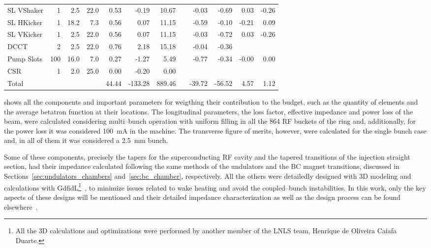 \begin{sidewaystable}
{\begin{tabular}{l d{0} d{-1} d{-1} d{-1} d{-1} d{-1} c d{-1} d{-1} d{-1} d{-1}}
            SL VShaker     &  1   &  2.5   &  22.0   &   0.53 &   -0.19 &   10.67 & &   -0.03 &   -0.69 &   0.03 &  -0.26 \\
            SL HKicker     &  1   &  18.2  &  7.3    &   0.56 &    0.07 &   11.15 & &   -0.59 &   -0.10 &  -0.21 &   0.09 \\
            SL VKicker     &  1   &  2.5   &  22.0   &   0.56 &    0.07 &   11.15 & &   -0.03 &   -0.72 &   0.03 &  -0.26 \\
            DCCT           &  2   &  2.5   &  22.0   &   0.76 &    2.18 &   15.18 & &   -0.04 &   -0.36 &        &        \\
            Pump Slots     & 100  &  16.0  &  7.0    &   0.27 &   -1.27 &    5.49 & &   -0.77 &   -0.34 &  -0.00 &   0.00 \\
            CSR            &  1   &  2.0   &  25.0   &   0.00 &   -0.20 &    0.00 & &         &         &        &        \\
            \midrule
            Total	       &      &        &         &  44.44 & -133.28 &  889.46 & &  -39.72 &  -56.52 &   4.57 &   1.12 \\
            \bottomrule
        \end{tabular}}
    \end{sidewaystable}
    shows all the components and important parameters for weigthing their contribution to the budget, such as the quantity of elements and the average betatron function at their locations. The longitudinal parameters, the loss factor, effective impedance and power loss of the beam, were calculated considering multi--bunch operation with uniform filling in all the \num{864} RF buckets of the ring and, additionally, for the power loss it was considered \SI{100}{\milli\ampere} in the machine. The transverse figure of merits, however, were calculated for the single bunch case and, in all of them it was considered a \SI{2.5}{\milli\meter} bunch.

    Some of these components, precisely the tapers for the superconducting RF cavity and the tapered transitions of the injection straight section, had their impedance calculated following the same methods of the undulators and the BC magnet transitions, discussed in Sections~\ref{sec:undulators_chambers} and~\ref{sec:bc_chamber}, respectively. All the others were detailedly designed with 3D modeling and calculations with GdfidL\footnote{All the 3D calculations and optimizations were performed by another member of the LNLS team, Henrique de Oliveira Caiafa Duarte.}~\cite{Bruns1997}, to minimize issues related to wake heating and avoid the  coupled--bunch instabilities. In this work, only the key aspects of these designs will be mentioned and their detailed impedance characterization as well as the design process can be found elsewhere~\cite{Duarte2013,Duarte2017,Duarte2017a}.

